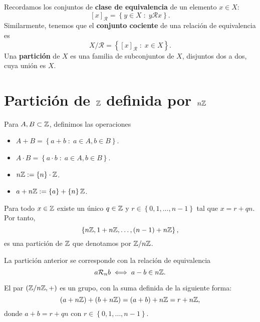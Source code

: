 Recordamos los conjuntos de \textbf{clase de equivalencia} de un elemento $\displaystyle x \in X $:
\[ [x]_{\mathcal{R}} = \left\{ y \in X \; : \; y \mathcal{R}x\right\}  .\]
Similarmente, tenemos que el \textbf{conjunto cociente} de una relación de equivalencia es
\[X/\mathcal{R} = \left\{ [x]_{\mathcal{R}}\; : \; x \in X\right\}  .\]
Una \textbf{partición} de $\displaystyle X $ es una familia de subconjuntos de $\displaystyle X $, disjuntos dos a dos, cuya unión es $\displaystyle X $. 
\section{Partición de $\displaystyle \mathbb{Z} $ definida por $\displaystyle n\mathbb{Z} $}
Para $\displaystyle A, B \subset \mathbb{Z} $, definimos las operaciones
\begin{itemize}
	\item $\displaystyle A + B = \left\{ a + b \; : \; a \in A, b \in B\right\}  $.
	\item $\displaystyle A \cdot B = \left\{ a \cdot b \; : \; a \in A, b \in B\right\}  $.
	\item $\displaystyle n\mathbb{Z} := \left\{ n\right\} \cdot \mathbb{Z} $.
	\item $\displaystyle a + n\mathbb{Z} := \left\{ a\right\} + \left\{ n\right\} \mathbb{Z} $.
\end{itemize}
\begin{theorem}
	Para todo $\displaystyle x \in \mathbb{Z} $ existe un único $\displaystyle q \in \mathbb{Z} $ y $\displaystyle r \in \left\{ 0, 1, \ldots, n-1\right\}  $ tal que $\displaystyle x = r + qn $. Por tanto, 
	\[ \left\{ n\mathbb{Z}, 1 + n\mathbb{Z}, \ldots, \left(n-1\right)+n\mathbb{Z}\right\}  ,\]
	es una partición de $\displaystyle \mathbb{Z} $ que denotamos por $\displaystyle \mathbb{Z}/n\mathbb{Z} $.
\end{theorem}
\begin{observation}
La partición anterior se corresponde con la relación de equivalencia 
\[a \mathcal{R}_{n} b \iff a - b \in n\mathbb{Z} .\]
\end{observation}
\begin{theorem}
El par $\displaystyle \left(\mathbb{Z}/n\mathbb{Z}, +\right) $ es un grupo, con la suma definida de la siguiente forma:
\[\left(a+n\mathbb{Z}\right)+\left(b+n\mathbb{Z}\right) = \left(a+b\right) +n\mathbb{Z} = r + n\mathbb{Z} ,\]
donde $\displaystyle a + b = r +qn $ con $\displaystyle r \in \left\{ 0, 1, \ldots, n -1\right\}  $.
\end{theorem}
